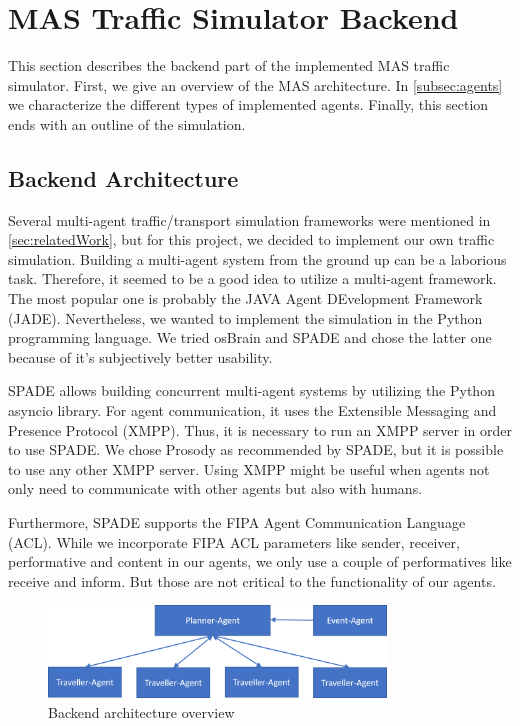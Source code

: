 \section{MAS Traffic Simulator Backend}\label{sec:backend}
This section describes the backend part of the implemented MAS traffic simulator. First, we give an overview of the MAS architecture.  In \autoref{subsec:agents} we characterize the different types of implemented agents. Finally, this section ends with an outline of the simulation.
\subsection{Backend Architecture}\label{subsec:backendArchitecture}
Several multi-agent traffic/transport simulation frameworks were mentioned in \autoref{sec:relatedWork}, but for this project, we decided to implement our own traffic simulation.  
Building a multi-agent system from the ground up can be a laborious task. Therefore, it seemed to be a good idea to utilize a multi-agent framework.
The most popular one is probably the JAVA Agent DEvelopment Framework (JADE). Nevertheless, we wanted to implement the simulation in the Python programming language.   We tried osBrain and SPADE and chose the latter one because of it's subjectively better usability.

SPADE allows building concurrent multi-agent systems by utilizing the Python asyncio library. For agent communication, it uses the Extensible Messaging and Presence Protocol (XMPP). Thus, it is necessary to run an XMPP server in order to use SPADE. We chose Prosody as recommended by SPADE, but it is possible to use any other XMPP server. Using XMPP might be useful when agents not only need to communicate with other agents but also with humans. 



Furthermore, SPADE supports the FIPA Agent Communication Language (ACL). While we incorporate FIPA ACL parameters like sender, receiver, performative and content in our agents, we only use a couple of performatives like receive and inform. But those are not critical to the functionality of our agents. 
\begin{figure}[h]
	\centering
	\includegraphics[width=0.8\textwidth]{images/backend_architecture.png}
	\caption{Backend architecture overview}
	\label{fig:backend_architecture}
\end{figure}

